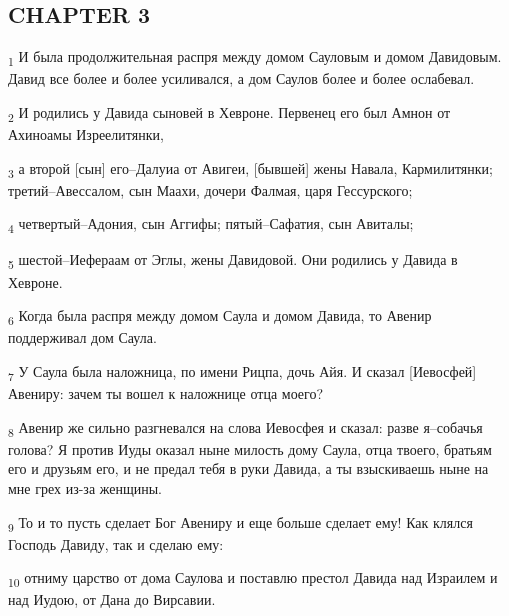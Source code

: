 \subsection{CHAPTER 3}
\begin{tcolorbox}
\textsubscript{1} И была продолжительная распря между домом Сауловым и домом Давидовым. Давид все более и более усиливался, а дом Саулов более и более ослабевал.
\end{tcolorbox}
\begin{tcolorbox}
\textsubscript{2} И родились у Давида сыновей в Хевроне. Первенец его был Амнон от Ахиноамы Изреелитянки,
\end{tcolorbox}
\begin{tcolorbox}
\textsubscript{3} а второй [сын] его--Далуиа от Авигеи, [бывшей] жены Навала, Кармилитянки; третий--Авессалом, сын Маахи, дочери Фалмая, царя Гессурского;
\end{tcolorbox}
\begin{tcolorbox}
\textsubscript{4} четвертый--Адония, сын Аггифы; пятый--Сафатия, сын Авиталы;
\end{tcolorbox}
\begin{tcolorbox}
\textsubscript{5} шестой--Иефераам от Эглы, жены Давидовой. Они родились у Давида в Хевроне.
\end{tcolorbox}
\begin{tcolorbox}
\textsubscript{6} Когда была распря между домом Саула и домом Давида, то Авенир поддерживал дом Саула.
\end{tcolorbox}
\begin{tcolorbox}
\textsubscript{7} У Саула была наложница, по имени Рицпа, дочь Айя. И сказал [Иевосфей] Авениру: зачем ты вошел к наложнице отца моего?
\end{tcolorbox}
\begin{tcolorbox}
\textsubscript{8} Авенир же сильно разгневался на слова Иевосфея и сказал: разве я--собачья голова? Я против Иуды оказал ныне милость дому Саула, отца твоего, братьям его и друзьям его, и не предал тебя в руки Давида, а ты взыскиваешь ныне на мне грех из-за женщины.
\end{tcolorbox}
\begin{tcolorbox}
\textsubscript{9} То и то пусть сделает Бог Авениру и еще больше сделает ему! Как клялся Господь Давиду, так и сделаю ему:
\end{tcolorbox}
\begin{tcolorbox}
\textsubscript{10} отниму царство от дома Саулова и поставлю престол Давида над Израилем и над Иудою, от Дана до Вирсавии.
\end{tcolorbox}
